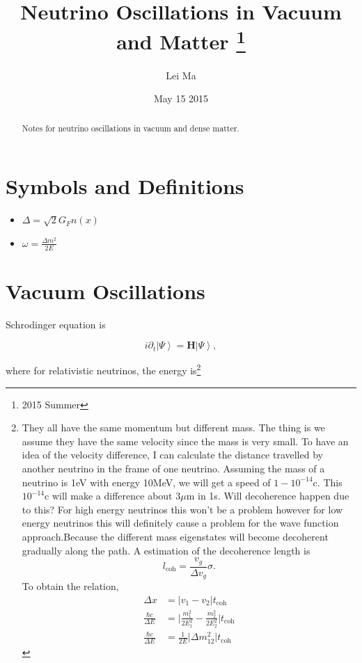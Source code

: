 \documentclass{tufte-handout}
\title{Neutrino Oscillations in Vacuum and Matter \thanks{2015 Summer}}
\author[Lei Ma]{Lei Ma}
\date{May 15 2015}  %
\newcommand{\ket}[1]{\left| #1\right\rangle}
\begin{document}
\maketitle%

\begin{abstract}
\noindent Notes for neutrino oscillations in vacuum and dense matter.
\end{abstract}

\tableofcontents



\section{Symbols and Definitions}

\begin{itemize}
\item 
$\Delta = \sqrt{2} G_F n(x) $
\item
$\omega = \frac{\Delta m^2}{2E}$
\end{itemize}


\newpage

\section{Vacuum Oscillations}

Schrodinger equation is

\begin{equation}
i\partial_t \ket{\Psi} = \mathbf H \ket{\Psi},
\end{equation}

where for relativistic neutrinos, the energy is\footnote{They all have the same momentum but different mass. The thing is we assume they have the same velocity since the mass is very small. To have an idea of the velocity difference, I can calculate the distance travelled by another neutrino in the frame of one neutrino.\newline
Assuming the mass of a neutrino is 1eV with energy 10MeV, we will get a speed of $1-10^{-14}$c. This $10^{-14}$c will make a difference about $3\mu\mathrm{ m}$ in 1s.
 \newline Will decoherence happen due to this? For high energy neutrinos this won't be a problem however for low energy neutrinos this will definitely cause a problem for the wave function approach.Because the different mass eigenstates will become decoherent gradually along the path.\newline
A estimation of the decoherence length is\begin{equation*}
l_{\mathrm{coh}}=\frac{v_g}{\Delta v_g}\sigma.
\end{equation*}
To obtain the relation,
\begin{align*}
\Delta x &= \lvert v_1 - v_2 \rvert t_{\mathrm{coh}}\\
\frac{\hbar c}{\Delta E} & = \lvert \frac{m_1^2}{2E_1^2} - \frac{m_2^2}{2E_2^2} \rvert t_{\mathrm{coh}} \\
\frac{\hbar c}{\Delta E} & = \frac{1}{2E}\lvert \Delta m_{12}^2 \rvert t_{\mathrm{coh}}
\end{align*}
}
\end{document}
